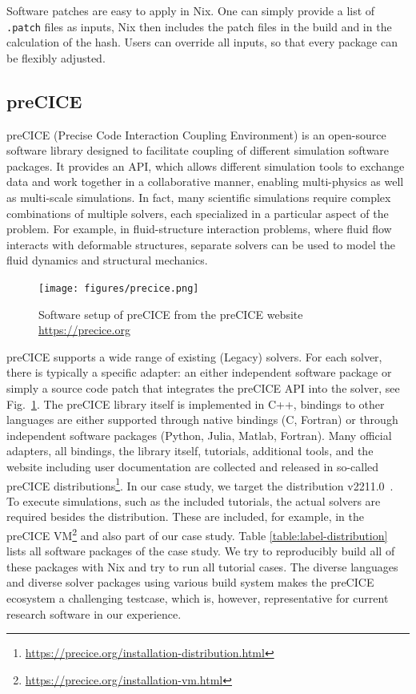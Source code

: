 \documentclass{eceasst}
\begin{document}
Software patches are easy to apply in Nix.
One can simply provide a list of \texttt{.patch} files as inputs, Nix then includes the patch files in the build and in the calculation of the hash.
Users can override all inputs, so that every package can be flexibly adjusted.


\subsection{preCICE}

preCICE (Precise Code Interaction Coupling Environment) is an open-source software library designed to facilitate coupling of different simulation software packages.
It provides an API, which allows different simulation tools to exchange data and work together in a collaborative manner, enabling multi-physics as well as multi-scale simulations.
In fact, many scientific simulations require complex combinations of multiple solvers, each specialized in a particular aspect of the problem.
For example, in fluid-structure interaction problems, where fluid flow interacts with deformable structures, separate solvers can be used to model the fluid dynamics and structural mechanics.

\begin{figure}
    \centering
    \texttt{[image: figures/precice.png]}
    \caption{Software setup of preCICE from the preCICE website \url{https://precice.org}}
    \label{fig:precice}
\end{figure}

preCICE supports a wide range of existing (Legacy) solvers. For each solver, there is typically a specific adapter: an either independent software package or simply a source code patch that integrates the preCICE API into the solver, see Fig.~\ref{fig:precice}.
The preCICE library itself is implemented in C++, bindings to other languages are either supported through native bindings (C, Fortran) or through independent software packages (Python, Julia, Matlab, Fortran).
Many official adapters, all bindings, the library itself, tutorials, additional tools, and the website including user documentation are collected and released in so-called preCICE distributions\footnote{\url{https://precice.org/installation-distribution.html}}.
In our case study, we target the distribution v2211.0~\cite{preciceDistribution}. To execute simulations, such as the included tutorials, the actual solvers are required besides the distribution. These are included, for example, in the preCICE VM\footnote{\url{https://precice.org/installation-vm.html}} and also part of our case study. Table \ref{table:label-distribution} lists all software packages of the case study. We try to reproducibly build all of these packages with Nix and try to run all tutorial cases.
The diverse languages and diverse solver packages using various build system makes the preCICE ecosystem a challenging testcase, which is, however, representative for current research software in our experience.
\end{document}
